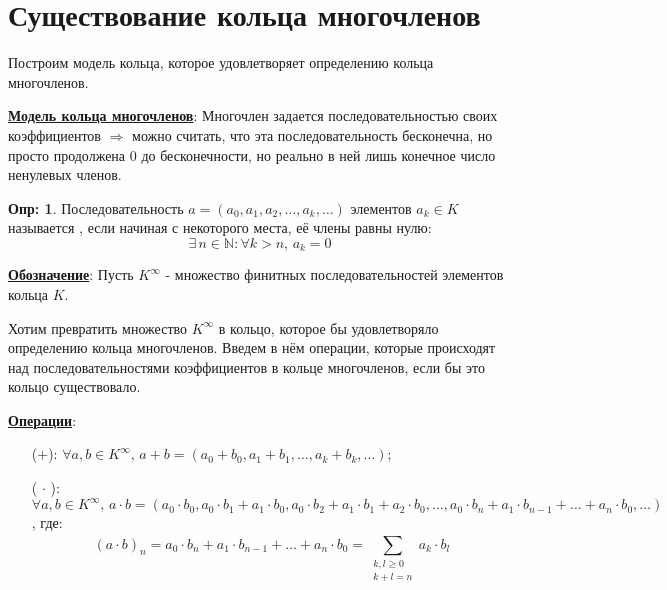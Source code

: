 \documentclass[12pt]{article}
\newcommand{\MN}{\mathbb{N}}
\theoremstyle{definition}
\newtheorem{defn}{Опр:}
\newcommand{\ddsum}[2]{\displaystyle\sum\limits_{#1}^{#2}}
\begin{document}
\newpage
\section*{Существование кольца многочленов}
Построим модель кольца, которое удовлетворяет определению кольца многочленов.

\textbf{\uline{Модель кольца многочленов}}: Многочлен задается последовательностью своих коэффициентов $\Rightarrow$ можно считать, что эта последовательность бесконечна, но просто продолжена $0$ до бесконечности, но реально в ней лишь конечное число ненулевых членов. 
\begin{defn}
	Последовательность $a = (a_0, a_1,a_2,\dotsc, a_k,\dotsc)$ элементов $a_k \in K$ называется , если начиная с некоторого места, её члены равны нулю:
	$$
		\exists \, n \in \MN \colon \forall k > n, \, a_k = 0
	$$
\end{defn}
\textbf{\uline{Обозначение}}: Пусть $K^{\infty}$ - множество финитных последовательностей элементов кольца $K$. 

Хотим превратить множество $K^{\infty}$ в кольцо, которое бы удовлетворяло определению кольца многочленов. Введем в нём операции, которые происходят над последовательностями коэффициентов в кольце многочленов, если бы это кольцо существовало.

\textbf{\uline{Операции}}:
\begin{enumerate}
	\item[($+$):] $\forall a, b \in K^{\infty}, \, a+ b = (a_0 + b_0, a_1 + b_1, \dotsc, a_k + b_k, \dotsc )$;
	\item[($\, \cdot\, $):] $\forall a, b \in K^{\infty}, \, a{\cdot}b = \left(a_0{\cdot}b_0, a_0{\cdot}b_1 + a_1{\cdot}b_0, a_0{\cdot}b_2 + a_1{\cdot}b_1 + a_2{\cdot}b_0, \dotsc, a_0{\cdot}b_n + a_1{\cdot}b_{n-1} + \dotsc + a_n{\cdot} b_0, \dotsc \right)$, где:
	$$
		(a{\cdot}b)_n = a_0 {\cdot}b_n + a_1{\cdot}b_{n-1} + \dotsc + a_n{\cdot} b_0 = \ddsum{\substack{k,l \geq 0\\k + l = n}}{}a_k{\cdot}b_l
	$$
\end{enumerate}
\end{document}
